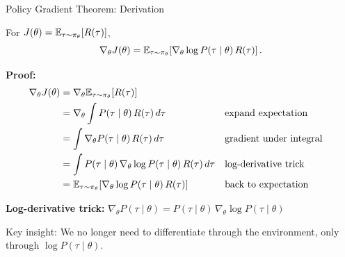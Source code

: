 \begin{frame}{Policy Gradient Theorem: Derivation}
  \begin{theorem}
    For $J(\theta) = \mathbb{E}_{\tau \sim \pi_\theta}[R(\tau)]$,
    \[
      \nabla_\theta J(\theta) = \mathbb{E}_{\tau \sim \pi_\theta}\!\left[\nabla_\theta \log P(\tau \mid \theta) \, R(\tau)\right].
    \]
  \end{theorem}

  \vspace{0.3em}
  \textbf{Proof:}
  \begin{align*}
    \nabla_\theta J(\theta) &= \nabla_\theta \mathbb{E}_{\tau \sim \pi_\theta}[R(\tau)] \\
    &= \nabla_\theta \int P(\tau \mid \theta) \, R(\tau) \, d\tau && \text{expand expectation} \\
    &= \int \nabla_\theta P(\tau \mid \theta) \, R(\tau) \, d\tau && \text{gradient under integral} \\
    &= \int P(\tau \mid \theta) \, \nabla_\theta \log P(\tau \mid \theta) \, R(\tau) \, d\tau && \text{log-derivative trick} \\
    &= \mathbb{E}_{\tau \sim \pi_\theta}\!\left[\nabla_\theta \log P(\tau \mid \theta) \, R(\tau)\right] && \text{back to expectation}
  \end{align*}

  \textbf{Log-derivative trick:} $\nabla_\theta P(\tau \mid \theta) = P(\tau \mid \theta) \, \nabla_\theta \log P(\tau \mid \theta)$

  \vspace{0.3em}
  Key insight: We no longer need to differentiate through the environment, only through $\log P(\tau \mid \theta)$.
\end{frame}

